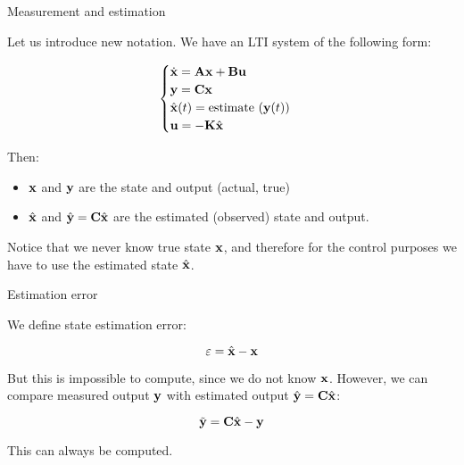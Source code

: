 \documentclass{beamer}
\begin{document}
\begin{frame}{Measurement and estimation}
\begin{flushleft}

Let us introduce new notation. We have an LTI system of the following form:

\begin{equation}
\begin{cases}
\dot {\mathbf{x}} = \mathbf{A} \mathbf{x} + \mathbf{B} \mathbf{u} \\
\mathbf{y} = \mathbf{C} \mathbf{x} \\
\hat{\mathbf{x}}(t) = \text{estimate} \ (\mathbf{y}(t)) \\
\mathbf{u} = -\mathbf{K}\hat{\mathbf{x}}
\end{cases}
\end{equation}

Then:

\begin{itemize}
\item $\mathbf{x}$ and $\mathbf{y}$ are the state and output (actual, true)
\item $\hat{\mathbf{x}}$ and $\hat{\mathbf{y}} =\mathbf{C} \hat{\mathbf{x}}$ are the estimated (observed) state
and output.
\end{itemize}

Notice that we never know true state $\mathbf{x}$, and therefore for the control purposes we have to use the estimated state $\hat{\mathbf{x}}$.

\end{flushleft}
\end{frame}




\begin{frame}{Estimation error}
	\begin{flushleft}
		
		We define state estimation error:
		
		\begin{equation}
			\varepsilon = \hat{\mathbf{x}} - \mathbf{x}
		\end{equation}
		
		But this is impossible to compute, since we do not know $\mathbf{x}$. However, we can compare measured output $\mathbf{y}$ with estimated output $\hat{\mathbf{y}} =\mathbf{C} \hat{\mathbf{x}}$:
		
		\begin{equation}
			\Tilde{\mathbf{y}} = \mathbf{C} \hat{\mathbf{x}} - \mathbf{y} 
		\end{equation}		
		
		This can always be computed.
		
	\end{flushleft}
\end{frame}
\end{document}
